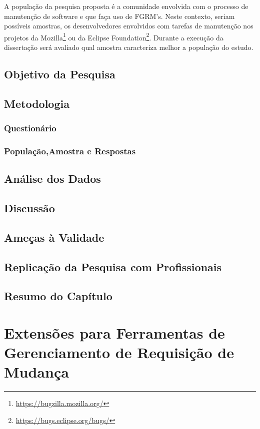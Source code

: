 \documentclass[msc]{ppgccufmg} %
\begin{document}
A população da pesquisa proposta é a comunidade envolvida com o processo de
manutenção de software e que faça uso de FGRM's. Neste contexto, seriam
possíveis amostras, os desenvolvedores envolvidos com tarefas de manutenção nos
projetos da Mozilla\footnote{\url{https://bugzilla.mozilla.org/}} ou da
Eclipse Foundation\footnote{\url{https://bugs.eclipse.org/bugs/}}. Durante a
execução da dissertação será avaliado qual amostra caracteriza melhor a
população do estudo.

\section{Objetivo da Pesquisa}

\section{Metodologia}


\subsection{Questionário}

\subsection{População,Amostra e Respostas}

\section{Análise dos Dados}

\section{Discussão}

\section{Ameças à Validade}

\section{Replicação da Pesquisa com Profissionais}

\section{Resumo do Capítulo}

\chapter{Extensões para Ferramentas de Gerenciamento de Requisição de Mudança}
\label{ch:extensoes}
\end{document}
